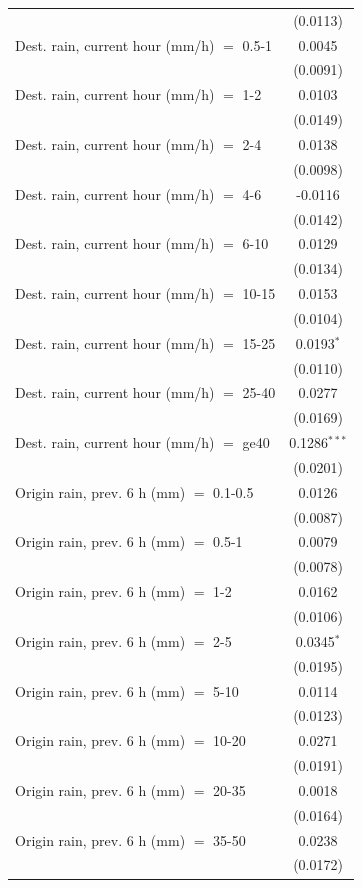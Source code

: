 \begin{tabular}{lc}
    & (0.0113)\\
   Dest. rain, current hour (mm/h) $=$ 0.5-1 & 0.0045\\
    & (0.0091)\\
   Dest. rain, current hour (mm/h) $=$ 1-2 & 0.0103\\
    & (0.0149)\\
   Dest. rain, current hour (mm/h) $=$ 2-4 & 0.0138\\
    & (0.0098)\\
   Dest. rain, current hour (mm/h) $=$ 4-6 & -0.0116\\
    & (0.0142)\\
   Dest. rain, current hour (mm/h) $=$ 6-10 & 0.0129\\
    & (0.0134)\\
   Dest. rain, current hour (mm/h) $=$ 10-15 & 0.0153\\
    & (0.0104)\\
   Dest. rain, current hour (mm/h) $=$ 15-25 & 0.0193$^{*}$\\
    & (0.0110)\\
   Dest. rain, current hour (mm/h) $=$ 25-40 & 0.0277\\
    & (0.0169)\\
   Dest. rain, current hour (mm/h) $=$ ge40 & 0.1286$^{***}$\\
    & (0.0201)\\
   Origin rain, prev. 6 h (mm) $=$ 0.1-0.5 & 0.0126\\
    & (0.0087)\\
   Origin rain, prev. 6 h (mm) $=$ 0.5-1 & 0.0079\\
    & (0.0078)\\
   Origin rain, prev. 6 h (mm) $=$ 1-2 & 0.0162\\
    & (0.0106)\\
   Origin rain, prev. 6 h (mm) $=$ 2-5 & 0.0345$^{*}$\\
    & (0.0195)\\
   Origin rain, prev. 6 h (mm) $=$ 5-10 & 0.0114\\
    & (0.0123)\\
   Origin rain, prev. 6 h (mm) $=$ 10-20 & 0.0271\\
    & (0.0191)\\
   Origin rain, prev. 6 h (mm) $=$ 20-35 & 0.0018\\
    & (0.0164)\\
   Origin rain, prev. 6 h (mm) $=$ 35-50 & 0.0238\\
    & (0.0172)\\

\end{tabular}
